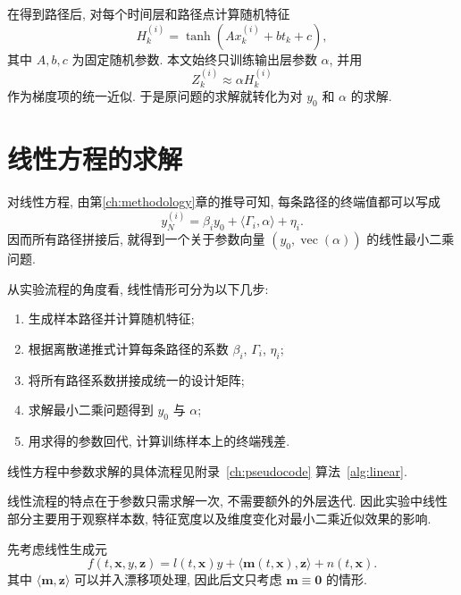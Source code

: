     在得到路径后, 对每个时间层和路径点计算随机特征
    \begin{equation*}
      H_{k}^{(i)} = \tanh(A x_{k}^{(i)} + b t_{k} + c),
    \end{equation*}
    其中 $A, b, c$ 为固定随机参数.
    本文始终只训练输出层参数 $\alpha$, 并用
    \begin{equation*}
      Z_{k}^{(i)} \approx \alpha H_{k}^{(i)}
    \end{equation*}
    作为梯度项的统一近似.
    于是原问题的求解就转化为对 $y_{0}$ 和 $\alpha$ 的求解.

  \section{线性方程的求解}\label{sec:linear}
    对线性方程, 由第\ref{ch:methodology}章的推导可知,
    每条路径的终端值都可以写成
    \begin{equation*}
      y_{N}^{(i)} = \beta_{i} y_{0} + \langle \Gamma_{i}, \alpha \rangle + \eta_{i}.
    \end{equation*}
    因而所有路径拼接后, 就得到一个关于参数向量 $(y_{0}, \operatorname{vec}(\alpha))$ 的线性最小二乘问题.

    从实验流程的角度看, 线性情形可分为以下几步:
    \begin{enumerate}
      \item 生成样本路径并计算随机特征;
      \item 根据离散递推式计算每条路径的系数 $\beta_{i}$, $\Gamma_{i}$, $\eta_{i}$;
      \item 将所有路径系数拼接成统一的设计矩阵;
      \item 求解最小二乘问题得到 $y_{0}$ 与 $\alpha$;
      \item 用求得的参数回代, 计算训练样本上的终端残差.
    \end{enumerate}
    线性方程中参数求解的具体流程见附录~\ref{ch:pseudocode} 算法~\ref{alg:linear}.

    线性流程的特点在于参数只需求解一次, 不需要额外的外层迭代.
    因此实验中线性部分主要用于观察样本数, 特征宽度以及维度变化对最小二乘近似效果的影响.


    先考虑线性生成元
    \begin{equation}
      f\!( t, \boldsymbol{x}, y, \boldsymbol{z})
      = l(t, \boldsymbol{x}) y
      + \langle \boldsymbol{m}(t, \boldsymbol{x}), \boldsymbol{z} \rangle
      + n(t, \boldsymbol{x}).
      \label{eq:linearf}
    \end{equation}
    其中 $\langle \boldsymbol{m}, \boldsymbol{z} \rangle$ 可以并入漂移项处理,
    因此后文只考虑 $\boldsymbol{m} \equiv \mathbf{0}$ 的情形.

